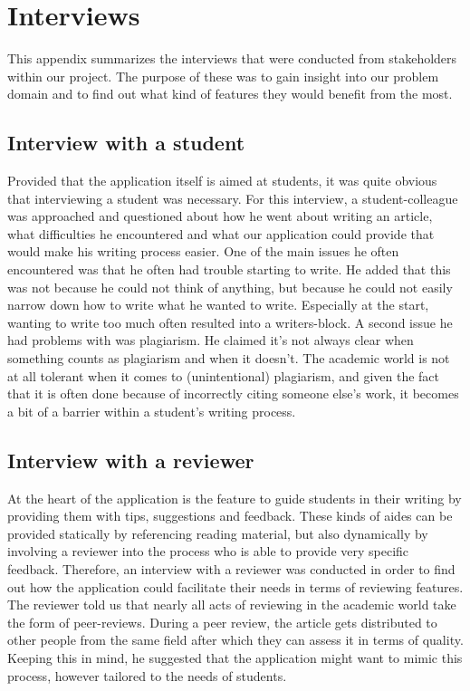 \chapter{Interviews}    
 This appendix summarizes the interviews that were conducted from stakeholders within our project. The purpose of these was to gain insight into our problem domain and to find out what kind of features they would benefit from the most.

\section{Interview with a student}
Provided that the application itself is aimed at students, it was quite obvious that interviewing a student was necessary. For this interview, a student-colleague was approached and questioned about how he went about writing an article, what difficulties he encountered and what our application could provide that would make his writing process easier. One of the main issues he often encountered was that he often had trouble starting to write. He added that this was not because he could not think of anything, but because he could not easily narrow down how to write what he wanted to write. Especially at the start, wanting to write too much often resulted into a writers-block.
A second issue he had problems with was plagiarism. He claimed it's not always clear when something counts as plagiarism and when it doesn't. The academic world is not at all tolerant when it comes to (unintentional) plagiarism, and given the fact that it is often done because of incorrectly citing someone else's work, it becomes a bit of a barrier within a student's writing process.

\section{Interview with a reviewer}
At the heart of the application is the feature to guide students in their writing by providing them with tips, suggestions and feedback. These kinds of aides can be provided statically by referencing reading material, but also dynamically by involving a reviewer into the process who is able to provide very specific feedback. Therefore, an interview with a reviewer was conducted in order to find out how the application could facilitate their needs in terms of reviewing features. The reviewer told us that nearly all acts of reviewing in the academic world take the form of peer-reviews. During a peer review, the article gets distributed to other people from the same field after which they can assess it in terms of quality. Keeping this in mind, he suggested that the application might want to mimic this process, however tailored to the needs of students.


